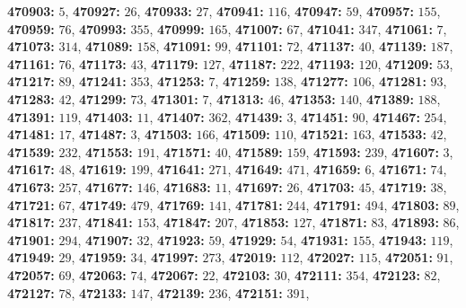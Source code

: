 \textsf{\bfseries 470903:} $5$, \textsf{\bfseries 470927:} $26$, \textsf{\bfseries 470933:} $27$, \textsf{\bfseries 470941:} $116$, \textsf{\bfseries 470947:} $59$, \textsf{\bfseries 470957:} $155$, \textsf{\bfseries 470959:} $76$, \textsf{\bfseries 470993:} $355$, \textsf{\bfseries 470999:} $165$, \textsf{\bfseries 471007:} $67$, \textsf{\bfseries 471041:} $347$, \textsf{\bfseries 471061:} $7$, \textsf{\bfseries 471073:} $314$, \textsf{\bfseries 471089:} $158$, \textsf{\bfseries 471091:} $99$, \textsf{\bfseries 471101:} $72$, \textsf{\bfseries 471137:} $40$, \textsf{\bfseries 471139:} $187$, \textsf{\bfseries 471161:} $76$, \textsf{\bfseries 471173:} $43$, \textsf{\bfseries 471179:} $127$, \textsf{\bfseries 471187:} $222$, \textsf{\bfseries 471193:} $120$, \textsf{\bfseries 471209:} $53$, \textsf{\bfseries 471217:} $89$, \textsf{\bfseries 471241:} $353$, \textsf{\bfseries 471253:} $7$, \textsf{\bfseries 471259:} $138$, \textsf{\bfseries 471277:} $106$, \textsf{\bfseries 471281:} $93$, \textsf{\bfseries 471283:} $42$, \textsf{\bfseries 471299:} $73$, \textsf{\bfseries 471301:} $7$, \textsf{\bfseries 471313:} $46$, \textsf{\bfseries 471353:} $140$, \textsf{\bfseries 471389:} $188$, \textsf{\bfseries 471391:} $119$, \textsf{\bfseries 471403:} $11$, \textsf{\bfseries 471407:} $362$, \textsf{\bfseries 471439:} $3$, \textsf{\bfseries 471451:} $90$, \textsf{\bfseries 471467:} $254$, \textsf{\bfseries 471481:} $17$, \textsf{\bfseries 471487:} $3$, \textsf{\bfseries 471503:} $166$, \textsf{\bfseries 471509:} $110$, \textsf{\bfseries 471521:} $163$, \textsf{\bfseries 471533:} $42$, \textsf{\bfseries 471539:} $232$, \textsf{\bfseries 471553:} $191$, \textsf{\bfseries 471571:} $40$, \textsf{\bfseries 471589:} $159$, \textsf{\bfseries 471593:} $239$, \textsf{\bfseries 471607:} $3$, \textsf{\bfseries 471617:} $48$, \textsf{\bfseries 471619:} $199$, \textsf{\bfseries 471641:} $271$, \textsf{\bfseries 471649:} $471$, \textsf{\bfseries 471659:} $6$, \textsf{\bfseries 471671:} $74$, \textsf{\bfseries 471673:} $257$, \textsf{\bfseries 471677:} $146$, \textsf{\bfseries 471683:} $11$, \textsf{\bfseries 471697:} $26$, \textsf{\bfseries 471703:} $45$, \textsf{\bfseries 471719:} $38$, \textsf{\bfseries 471721:} $67$, \textsf{\bfseries 471749:} $479$, \textsf{\bfseries 471769:} $141$, \textsf{\bfseries 471781:} $244$, \textsf{\bfseries 471791:} $494$, \textsf{\bfseries 471803:} $89$, \textsf{\bfseries 471817:} $237$, \textsf{\bfseries 471841:} $153$, \textsf{\bfseries 471847:} $207$, \textsf{\bfseries 471853:} $127$, \textsf{\bfseries 471871:} $83$, \textsf{\bfseries 471893:} $86$, \textsf{\bfseries 471901:} $294$, \textsf{\bfseries 471907:} $32$, \textsf{\bfseries 471923:} $59$, \textsf{\bfseries 471929:} $54$, \textsf{\bfseries 471931:} $155$, \textsf{\bfseries 471943:} $119$, \textsf{\bfseries 471949:} $29$, \textsf{\bfseries 471959:} $34$, \textsf{\bfseries 471997:} $273$, \textsf{\bfseries 472019:} $112$, \textsf{\bfseries 472027:} $115$, \textsf{\bfseries 472051:} $91$, \textsf{\bfseries 472057:} $69$, \textsf{\bfseries 472063:} $74$, \textsf{\bfseries 472067:} $22$, \textsf{\bfseries 472103:} $30$, \textsf{\bfseries 472111:} $354$, \textsf{\bfseries 472123:} $82$, \textsf{\bfseries 472127:} $78$, \textsf{\bfseries 472133:} $147$, \textsf{\bfseries 472139:} $236$, \textsf{\bfseries 472151:} $391$, 
